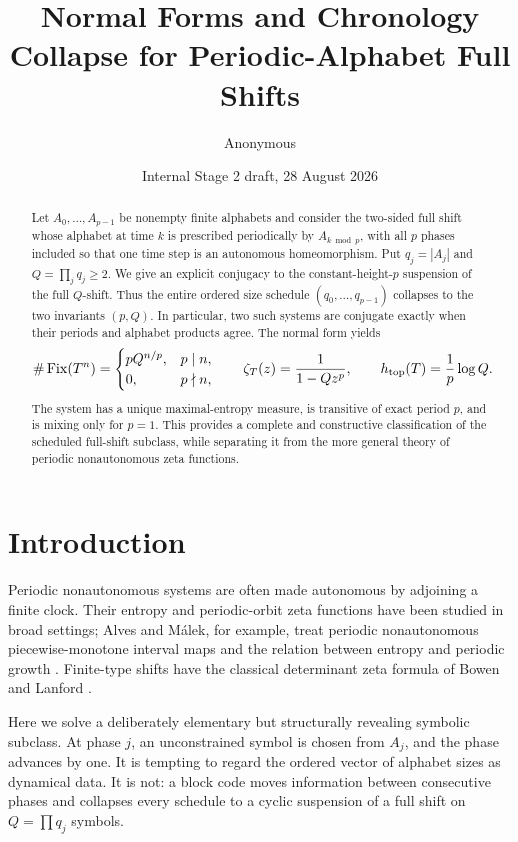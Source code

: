 \documentclass[11pt,a4paper]{amsart}
\title[Periodic-alphabet full shifts]{Normal Forms and Chronology Collapse for Periodic-\!Alphabet Full Shifts}
\author{Anonymous}
\date{Internal Stage 2 draft, 28 August 2026}
\theoremstyle{definition}
\theoremstyle{remark}
\newcommand{\Fix}{\operatorname{Fix}}
\begin{document}
\begin{abstract}
Let $A_0,\ldots,A_{p-1}$ be nonempty finite alphabets and consider the
two-sided full shift whose alphabet at time $k$ is prescribed periodically by
$A_{k\bmod p}$, with all $p$ phases included so that one time step is an
autonomous homeomorphism.  Put $q_j=|A_j|$ and $Q=\prod_jq_j\geq2$.
We give an explicit conjugacy to the constant-height-$p$ suspension of the
full $Q$-shift.  Thus the entire ordered size schedule
$(q_0,\ldots,q_{p-1})$ collapses to the two invariants $(p,Q)$.  In
particular, two such systems are conjugate exactly when their periods and
alphabet products agree.  The normal form yields
\[
 \#\Fix(T^n)=
 \begin{cases}pQ^{n/p},&p\mid n,\\0,&p\nmid n,\end{cases}
 \qquad
 \zeta_T(z)=\frac1{1-Qz^p},
 \qquad
 h_{\rm top}(T)=\frac1p\log Q.
\]
The system has a unique maximal-entropy measure, is transitive of exact
period $p$, and is mixing only for $p=1$.  This provides a complete and
constructive classification of the scheduled full-shift subclass, while
separating it from the more general theory of periodic nonautonomous zeta
functions.
\end{abstract}

\maketitle

\section{Introduction}

Periodic nonautonomous systems are often made autonomous by adjoining a
finite clock.  Their entropy and periodic-orbit zeta functions have been
studied in broad settings; Alves and M\'alek, for example, treat periodic
nonautonomous piecewise-monotone interval maps and the relation between
entropy and periodic growth \cite{AlvesMalek2013}.  Finite-type shifts have
the classical determinant zeta formula of Bowen and Lanford
\cite{BowenLanford1970}.

Here we solve a deliberately elementary but structurally revealing symbolic
subclass.  At phase $j$, an unconstrained symbol is chosen from $A_j$, and
the phase advances by one.  It is tempting to regard the ordered vector of
alphabet sizes as dynamical data.  It is not: a block code moves information
between consecutive phases and collapses every schedule to a cyclic
suspension of a full shift on $Q=\prod q_j$ symbols.
\end{document}
